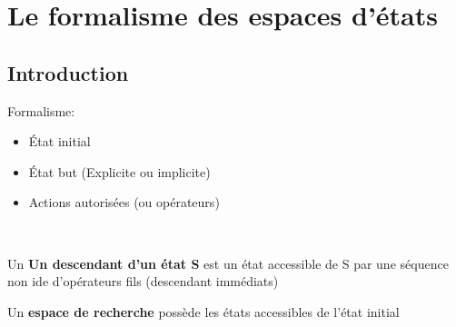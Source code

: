 \documentclass[12pt,a4paper,openany]{book}
\begin{document}
	\tableofcontents
	\chapter{Le formalisme des espaces d'états}
		\section{Introduction}

		Formalisme: 
		\begin{itemize}
			\item État initial
			\item État but (Explicite ou implicite)
			\item Actions autorisées (ou opérateurs)
		\end{itemize}
~

		\begin{definition}
			Un \textbf{Un descendant d'un état S} est un état accessible de S par une séquence non ide d'opérateurs fils (descendant immédiats)
		\end{definition}

		\begin{definition}
			Un \textbf{espace de recherche} possède les états accessibles de l'état initial\\
			~
		\end{definition}
\end{document}
